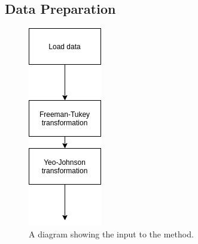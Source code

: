             \subsection{Data Preparation} \label{sec:pca_data_driven_surrogate_signal_extraction_methods_for_dynamic_pet_methods_data_preparation}
                \begin{figure}
                    \centering
                    
                    \includegraphics[width=0.5\linewidth]{figures/pca_data_driven_surrogate_signal_extraction_methods_for_dynamic_pet_methods_data_driven_surrogate_signal_extraction_input.png}
                    
                    \captionsetup{singlelinecheck=false, justification=centering}
                    \caption{A diagram showing the input to the method.}
                    \label{fig:pca_data_driven_surrogate_signal_extraction_methods_for_dynamic_pet_methods_data_driven_surrogate_signal_extraction_input}
                \end{figure}
                
